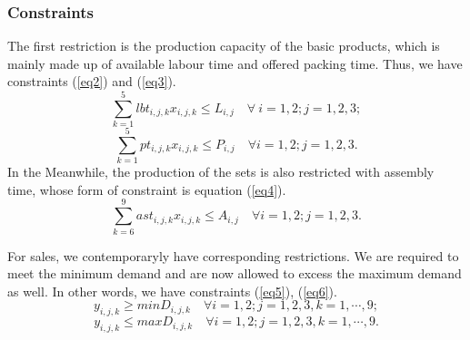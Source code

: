 \documentclass[12pt]{article}
\begin{document}
	\subsubsection{Constraints}
	The first restriction is the production capacity of the basic products, which is mainly made up of available labour time and offered packing time. Thus, we have constraints (\ref{eq2}) and (\ref{eq3}).
	\begin{equation}
		\label{eq2}
		\sum\limits_{k=1}^5lbt_{i,j,k}x_{i,j,k}\leq L_{i,j}\quad \forall\ i=1,2;j=1,2,3;
	\end{equation}
	\begin{equation}
		\label{eq3}
		\sum\limits_{k=1}^5pt_{i,j,k}x_{i,j,k}\leq P_{i,j}\quad \forall i=1,2;j=1,2,3.
	\end{equation}
	In the Meanwhile, the production of the sets is also restricted with assembly time, whose form of constraint  is equation (\ref{eq4}).
	\begin{equation}
		\label{eq4}
		\sum\limits_{k=6}^9ast_{i,j,k}x_{i,j,k}\leq A_{i,j}\quad \forall i=1,2;j=1,2,3.
	\end{equation}

	\noindent For sales, we contemporaryly have corresponding restrictions. We are required to meet the minimum demand and are now allowed to excess the maximum demand as well. In other words, we have constraints (\ref{eq5}), (\ref{eq6}).
	\begin{equation}
		\label{eq5}
		y_{i,j,k}\geq minD_{i,j,k}\quad \forall i=1,2;j=1,2,3,k=1,\cdots,9;
	\end{equation}
	\begin{equation}
		\label{eq6}
		y_{i,j,k}\leq maxD_{i,j,k}\quad \forall i=1,2;j=1,2,3,k=1,\cdots,9.
	\end{equation}
\end{document}
